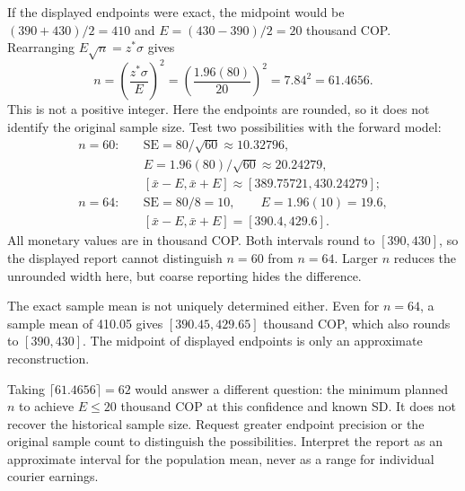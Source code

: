 If the displayed endpoints were exact, the midpoint would be $(390+430)/2=410$ and $E=(430-390)/2=20$ thousand COP. Rearranging $E\sqrt n=z^*\sigma$ gives
\[
n=\left(\frac{z^*\sigma}{E}\right)^2
=\left(\frac{1.96(80)}{20}\right)^2
=7.84^2=61.4656.
\]
This is not a positive integer. Here the endpoints are rounded, so it does not identify the original sample size. Test two possibilities with the forward model:
\[
\begin{aligned}
n=60:\quad &\mathrm{SE}=80/\sqrt{60}\approx10.32796,\\
&E=1.96(80)/\sqrt{60}\approx20.24279,\\
&[\bar x-E,\bar x+E]\approx[389.75721,430.24279];\\[3pt]
n=64:\quad &\mathrm{SE}=80/8=10,\qquad E=1.96(10)=19.6,\\
&[\bar x-E,\bar x+E]=[390.4,429.6].
\end{aligned}
\]
All monetary values are in thousand COP. Both intervals round to $[390,430]$, so the displayed report cannot distinguish $n=60$ from $n=64$. Larger $n$ reduces the unrounded width here, but coarse reporting hides the difference.

The exact sample mean is not uniquely determined either. Even for $n=64$, a sample mean of 410.05 gives $[390.45,429.65]$ thousand COP, which also rounds to $[390,430]$. The midpoint of displayed endpoints is only an approximate reconstruction.

Taking $\lceil61.4656\rceil=62$ would answer a different question: the minimum planned $n$ to achieve $E\leq20$ thousand COP at this confidence and known SD. It does not recover the historical sample size. Request greater endpoint precision or the original sample count to distinguish the possibilities. Interpret the report as an approximate interval for the population mean, never as a range for individual courier earnings.

